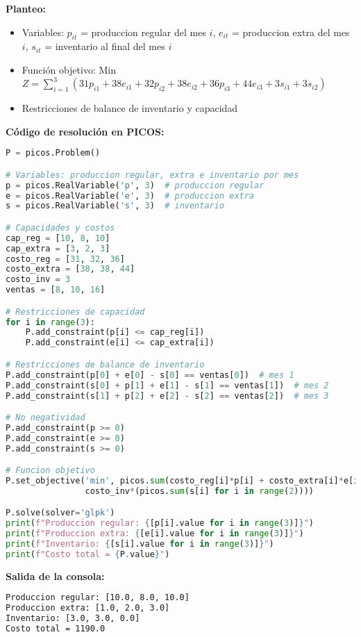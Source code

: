 \documentclass[12pt]{article}
\begin{document}
\textbf{Planteo:}
\begin{itemize}
\item Variables: $p_{it}$ = produccion regular del mes $i$, $e_{it}$ = produccion extra del mes $i$, $s_{it}$ = inventario al final del mes $i$
\item Función objetivo: Min $Z = \sum_{i=1}^3 (31p_{i1} + 38e_{i1} + 32p_{i2} + 38e_{i2} + 36p_{i3} + 44e_{i3} + 3s_{i1} + 3s_{i2})$
\item Restricciones de balance de inventario y capacidad
\end{itemize}

\textbf{Código de resolución en PICOS:}
\begin{lstlisting}[language=Python]
P = picos.Problem()

# Variables: produccion regular, extra e inventario por mes
p = picos.RealVariable('p', 3)  # produccion regular
e = picos.RealVariable('e', 3)  # produccion extra
s = picos.RealVariable('s', 3)  # inventario

# Capacidades y costos
cap_reg = [10, 8, 10]
cap_extra = [3, 2, 3]
costo_reg = [31, 32, 36]
costo_extra = [38, 38, 44]
costo_inv = 3
ventas = [8, 10, 16]

# Restricciones de capacidad
for i in range(3):
    P.add_constraint(p[i] <= cap_reg[i])
    P.add_constraint(e[i] <= cap_extra[i])

# Restricciones de balance de inventario
P.add_constraint(p[0] + e[0] - s[0] == ventas[0])  # mes 1
P.add_constraint(s[0] + p[1] + e[1] - s[1] == ventas[1])  # mes 2
P.add_constraint(s[1] + p[2] + e[2] - s[2] == ventas[2])  # mes 3

# No negatividad
P.add_constraint(p >= 0)
P.add_constraint(e >= 0)
P.add_constraint(s >= 0)

# Funcion objetivo
P.set_objective('min', picos.sum(costo_reg[i]*p[i] + costo_extra[i]*e[i] for i in range(3)) + 
                costo_inv*(picos.sum(s[i] for i in range(2))))

P.solve(solver='glpk')
print(f"Produccion regular: {[p[i].value for i in range(3)]}")
print(f"Produccion extra: {[e[i].value for i in range(3)]}")
print(f"Inventario: {[s[i].value for i in range(3)]}")
print(f"Costo total = {P.value}")
\end{lstlisting}

\textbf{Salida de la consola:}
\begin{lstlisting}[language=bash,backgroundcolor=\color{black},basicstyle=\color{white}\ttfamily,numbers=none]
Produccion regular: [10.0, 8.0, 10.0]
Produccion extra: [1.0, 2.0, 3.0]
Inventario: [3.0, 3.0, 0.0]
Costo total = 1190.0
\end{lstlisting}
\end{document}
